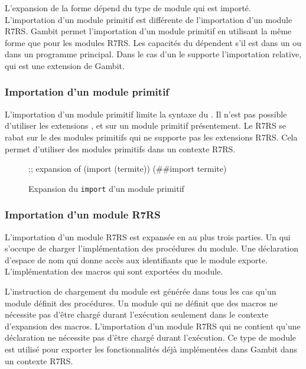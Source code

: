 L'expansion de la forme  dépend du type de module qui
est importé. L'importation d'un module primitif est différente de l'importation
d'un module R7RS. Gambit permet l'importation d'un module primitif en utilisant
la même forme que pour les modules R7RS. Les capacités du 
dépendent s'il est dans un  ou dans un programme principal. Dans
le cas d'un  le  supporte l'importation
relative, qui est une extension de Gambit.


\subsubsection{Importation d'un module primitif}
L'importation d'un module primitif limite la syntaxe du .
Il n'est pas possible d'utiliser les extensions , 
et  sur un module primitif présentement. Le  R7RS se rabat
sur le  des modules primitifs qui ne supporte pas les extensions R7RS.
Cela permet d'utiliser des modules primitifs dans un contexte R7RS.\\
\begin{figure}[ht]
\begin{mplisting}{0.8}
;; expansion of (import (termite))
(##import termite)
\end{mplisting}
    \caption{Expansion du \texttt{import} d'un module primitif}
    \label{fig:import->expand-primitive}
\end{figure}

\subsubsection{Importation d'un module R7RS}

L'importation d'un module R7RS est expansée en au plus trois parties.  Un
 qui s'occupe de charger l'implémentation des
procédures du module. Une déclaration d'espace de nom qui donne accès aux
identifiants que le module exporte. L'implémentation des macros qui sont
exportées du module.

L'instruction de chargement du module est générée dans tous les cas qu'un
module définit des procédures. Un module qui ne définit que des macros ne
nécessite pas d'être chargé durant l'exécution seulement dans le contexte
d'expansion des macros. L'importation d'un module R7RS qui ne contient qu'une
déclaration  ne nécessite pas d'être chargé durant l'exécution.
Ce type de module est utilisé pour exporter les fonctionnalités déjà
implémentées dans Gambit dans un contexte R7RS.

